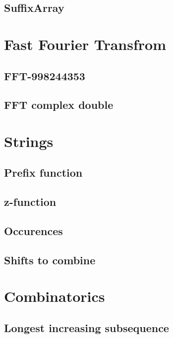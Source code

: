 \documentclass[a4paper,twocolumn]{extarticle}
\begin{document}
{        \subsection{SuffixArray}
        

        \section{Fast Fourier Transfrom}
        \subsection{FFT-998244353}
        
        \subsection{FFT complex double}
        

        \section{Strings}
        \subsection{Prefix function}
        
        \subsection{z-function}
        
        \subsection{Occurences}
        
        \subsection{Shifts to combine}
        

        \section{Combinatorics}
        \subsection{Longest increasing subsequence}
        
}
\end{document}
